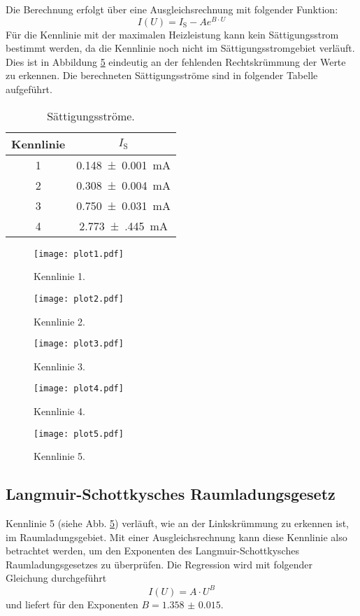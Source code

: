 Die Berechnung erfolgt über eine Ausgleichsrechnung mit folgender Funktion:
\begin{equation}
  I(U) = I_\text{S} - A e^{B \cdot U}
\end{equation}
Für die Kennlinie mit der maximalen Heizleistung kann kein Sättigungsstrom bestimmt werden, da die Kennlinie noch nicht im Sättigungsstromgebiet verläuft.
Dies ist in Abbildung \ref{fig:plot5} eindeutig an der fehlenden Rechtskrümmung der Werte zu erkennen.
Die berechneten Sättigungsströme sind in folgender Tabelle aufgeführt.
\begin{table}
\centering
\caption{Sättigungsströme.}
\label{tab:a}
\begin{tabular}{c c}
\toprule
Kennlinie & $I_\text{S}$ \\
\midrule
1 & \SI{0.148(1)}{\milli\ampere} \\
2 & \SI{0.308(4)}{\milli\ampere} \\
3 & \SI{0.750(31)}{\milli\ampere} \\
4 & \SI{2.773(445)}{\milli\ampere} \\
\bottomrule
\end{tabular}
\end{table}
\begin{figure}
  \centering
  \texttt{[image: plot1.pdf]}
  \caption{Kennlinie 1.}
  \label{fig:plot1}
\end{figure}
\begin{figure}
  \centering
  \texttt{[image: plot2.pdf]}
  \caption{Kennlinie 2.}
  \label{fig:plot2}
\end{figure}
\begin{figure}
  \centering
  \texttt{[image: plot3.pdf]}
  \caption{Kennlinie 3.}
  \label{fig:plot3}
\end{figure}
\begin{figure}
  \centering
  \texttt{[image: plot4.pdf]}
  \caption{Kennlinie 4.}
  \label{fig:plot4}
\end{figure}
\begin{figure}
  \centering
  \texttt{[image: plot5.pdf]}
  \caption{Kennlinie 5.}
  \label{fig:plot5}
\end{figure}

\FloatBarrier
\subsection{Langmuir-Schottkysches Raumladungsgesetz}
\label{sec:expo}

Kennlinie 5 (siehe Abb. \ref{fig:plot5}) verläuft, wie an der Linkskrümmung zu erkennen ist, im Raumladungsgebiet.
Mit einer Ausgleichsrechnung kann diese Kennlinie also betrachtet werden, um den Exponenten des Langmuir-Schottkysches Raumladungsgesetzes zu überprüfen.
Die Regression wird mit folgender Gleichung durchgeführt
\begin{equation}
  I(U) = A \cdot U^B
\end{equation}
und liefert für den Exponenten $B = \num{1.358(15)}$.


